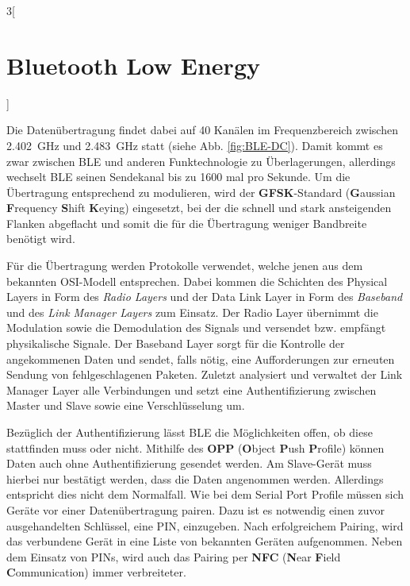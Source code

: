 \begin{multicols}{3}[\section{Bluetooth Low Energy}]
\begin{Figure}
\label{fig:BLE-DC}
\end{Figure}
Die Datenübertragung findet dabei auf 40 Kanälen im Frequenzbereich zwischen \SI{2,402}{\giga\hertz} und \SI{2,483}{\giga\hertz} statt (siehe Abb. \ref{fig:BLE-DC}). Damit kommt es zwar zwischen BLE und anderen Funktechnologie zu Überlagerungen, allerdings wechselt BLE seinen Sendekanal bis zu 1600 mal pro Sekunde.
Um die Übertragung entsprechend zu modulieren, wird der \textbf{GFSK}-Standard (\textbf{G}aussian \textbf{F}requency \textbf{S}hift \textbf{K}eying) eingesetzt, bei der die schnell und stark ansteigenden Flanken abgeflacht und somit die für die Übertragung weniger Bandbreite benötigt wird.

Für die Übertragung werden Protokolle verwendet, welche jenen aus dem bekannten OSI-Modell entsprechen. Dabei kommen die Schichten des Physical Layers in Form des \textit{Radio Layers} und der Data Link Layer in Form des \textit{Baseband} und des \textit{Link Manager Layers} zum Einsatz. 
Der Radio Layer übernimmt die Modulation sowie die Demodulation des Signals und versendet bzw. empfängt physikalische Signale. Der Baseband Layer sorgt für die Kontrolle der angekommenen Daten und sendet, falls nötig, eine Aufforderungen zur erneuten Sendung von fehlgeschlagenen Paketen. Zuletzt analysiert und verwaltet der Link Manager Layer alle Verbindungen und setzt eine Authentifizierung zwischen Master und Slave sowie eine Verschlüsselung um.

Bezüglich der Authentifizierung lässt BLE die Möglichkeiten offen, ob diese stattfinden muss oder nicht. Mithilfe des \textbf{OPP} (\textbf{O}bject \textbf{P}ush \textbf{P}rofile) können Daten auch ohne Authentifizierung gesendet werden. Am Slave-Gerät muss hierbei nur bestätigt werden, dass die Daten angenommen werden. Allerdings entspricht dies nicht dem Normalfall.
Wie bei dem Serial Port Profile müssen sich Geräte vor einer Datenübertragung pairen. Dazu ist es notwendig einen zuvor ausgehandelten Schlüssel, eine PIN, einzugeben. Nach erfolgreichem Pairing, wird das verbundene Gerät in eine Liste von bekannten Geräten aufgenommen. Neben dem Einsatz von PINs, wird auch das Pairing per \textbf{NFC} (\textbf{N}ear \textbf{F}ield \textbf{C}ommunication) immer verbreiteter.


\end{multicols}
